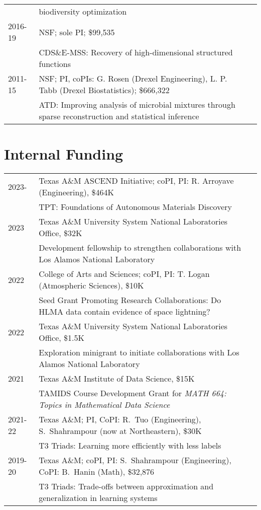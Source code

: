 \documentclass[11pt]{article}
\begin{document}
\begin{tabular}{lll}
& \hspace{-15mm} biodiversity optimization\\
2016-19 & NSF; sole PI;
\$99,535 
\\
& \hspace{-15mm}
{\small CDS\&E-MSS:} Recovery of high-dimensional structured functions
\\
2011-15 & NSF; PI, coPIs: G. Rosen (Drexel Engineering), L. P. Tabb (Drexel Biostatistics); 
\$666,322\\
& \hspace{-15mm}
{\small ATD:} Improving analysis of microbial mixtures through sparse
reconstruction and statistical inference
\end{tabular}

\section{Internal Funding}

\begin{tabular}{lll}
2023- & Texas A\&M ASCEND Initiative; coPI, PI: R. Arroyave (Engineering), \$464K\\
& \hspace{-15mm}
{\small TPT:} Foundations of Autonomous Materials Discovery\\
2023 & Texas A\&M University System National Laboratories Office, \$32K\\
& \hspace{-15mm}
Development fellowship to strengthen collaborations with Los Alamos National Laboratory\\
2022 & College of Arts and Sciences;
coPI, PI: T. Logan (Atmospheric Sciences),  \$10K\\
& \hspace{-15mm}
{\small Seed Grant Promoting Research Collaborations:}
Do HLMA data contain evidence of space lightning?\\
2022 & Texas A\&M University System National Laboratories Office, \$1.5K\\
& \hspace{-15mm}
Exploration minigrant to initiate collaborations with Los Alamos National Laboratory\\
2021 & Texas A\&M Institute of Data Science, \$15K\\
& \hspace{-15mm}
TAMIDS Course Development Grant for {\em MATH 664: Topics in Mathematical Data Science}\\
2021-22 & Texas A\&M; PI,  CoPI: R.~Tuo (Engineering), S.~Shahrampour (now at Northeastern), \$30K\\
& \hspace{-15mm}
{\small T3 Triads:} Learning more efficiently with less labels\\
2019-20 & Texas A\&M; coPI, PI: S.~Shahrampour (Engineering), CoPI: B.~Hanin (Math), \$32,876\\
& \hspace{-15mm}
{\small T3 Triads:} Trade-offs between approximation and generalization in learning systems
\end{tabular}
\end{document}
